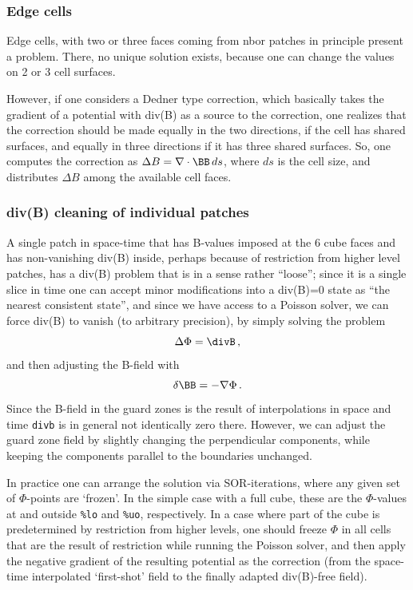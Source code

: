 \documentclass[paper=a4,fontsize=11pt]{scrartcl}
\numberwithin{equation}{section}		%
\numberwithin{figure}{section}			%
\numberwithin{table}{section}				%
\newcommand{\codecolor}{\color{Blue}}
\newcommand{\Code}[1]{{\codecolor\texttt{#1}}}
\begin{document}
\subsubsection{Edge cells}
Edge cells, with two or three faces coming from nbor patches in principle present a problem.  There, no unique solution exists, because one can change the values on 2 or 3 cell surfaces.

However, if one considers a Dedner type correction, which basically takes the gradient of a potential with div(B) as a source to the correction, one realizes that the correction should be made equally in the two directions, if the cell has  shared surfaces, and equally in three directions if it has three shared surfaces.  So, one computes the correction as $\Delta B=\nabla\cdot \BB \, ds$, where $ds$ is the cell size, and distributes $\Delta B$ among the available cell faces.

\subsubsection{div(B) cleaning of individual patches}
A single patch in space-time that has B-values imposed at the 6 cube faces and has non-vanishing div(B) inside, perhaps because of restriction from higher level patches, has a div(B) problem that is in a sense rather ``loose''; since it is a single slice in time one can accept minor modifications into a div(B)=0 state as ``the nearest consistent state'', and since we have access to a Poisson solver, we can force div(B) to vanish (to arbitrary precision), by simply solving the problem
\begin{equation}
    \Delta \Phi = \divB \,,
\end{equation}
and then adjusting the B-field with
\begin{equation}
    \delta \BB = -\nabla \Phi \,.
\end{equation}
Since the B-field in the guard zones is the result of interpolations in space and time \Code{divb} is in general not identically zero there.  However, we can adjust the guard zone field by slightly changing the perpendicular components, while keeping the components parallel to the boundaries unchanged.

In practice one can arrange the solution via SOR-iterations, where any given set of $\Phi$-points are `frozen'.  In the simple case with a full cube, these are the $\Phi$-values at and outside \texttt{\%lo} and \texttt{\%uo}, respectively.  In a case where part of the cube is predetermined by restriction from higher levels, one should freeze $\Phi$ in all cells that are the result of restriction while running the Poisson solver, and then apply the negative gradient of the resulting potential as the correction (from the space-time interpolated `first-shot' field to the finally adapted div(B)-free field).
\end{document}
